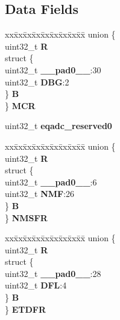 \subsection*{Data Fields}
\begin{DoxyCompactItemize}
\item 
\mbox{\label{structEQADC__tag_a48bac28d0579157e58e0e57d4b543382}} 
\begin{tabbing}
xx\=xx\=xx\=xx\=xx\=xx\=xx\=xx\=xx\=\kill
union \{\\
\>uint32\_t {\bfseries R}\\
\>struct \{\\
\>\>uint32\_t {\bfseries \_\_pad0\_\_}:30\\
\>\>uint32\_t {\bfseries DBG}:2\\
\>\} {\bfseries B}\\
\} {\bfseries MCR}\\

\end{tabbing}\item 
\mbox{\label{structEQADC__tag_a3132d4480d7fba8f029330ab54f25634}} 
uint32\+\_\+t {\bfseries eqadc\+\_\+reserved0}
\item 
\mbox{\label{structEQADC__tag_a1ed97c6971cc9c286d9469e3ffc08581}} 
\begin{tabbing}
xx\=xx\=xx\=xx\=xx\=xx\=xx\=xx\=xx\=\kill
union \{\\
\>uint32\_t {\bfseries R}\\
\>struct \{\\
\>\>uint32\_t {\bfseries \_\_pad0\_\_}:6\\
\>\>uint32\_t {\bfseries NMF}:26\\
\>\} {\bfseries B}\\
\} {\bfseries NMSFR}\\

\end{tabbing}\item 
\mbox{\label{structEQADC__tag_a188603ec413e41897afc90031685477b}} 
\begin{tabbing}
xx\=xx\=xx\=xx\=xx\=xx\=xx\=xx\=xx\=\kill
union \{\\
\>uint32\_t {\bfseries R}\\
\>struct \{\\
\>\>uint32\_t {\bfseries \_\_pad0\_\_}:28\\
\>\>uint32\_t {\bfseries DFL}:4\\
\>\} {\bfseries B}\\
\} {\bfseries ETDFR}\\


\end{tabbing}
\end{DoxyCompactItemize}
